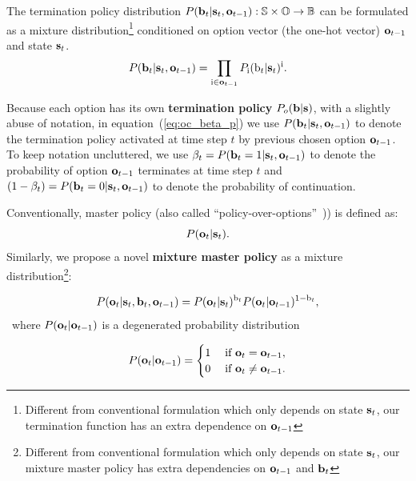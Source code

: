 The termination policy distribution
$P({\mathbf{b}}_t|{\mathbf{s}}_t,{\mathbf{o}}_{t-1}):{\mathbb{S}}\times{\mathbb{O}}\rightarrow{\mathbb{B}}$ can be
formulated as a mixture distribution\footnote{Different from
  conventional formulation which only depends on state ${\mathbf{s}}_t$,
  our termination function has an extra dependence on
  ${\mathbf{o}}_{t-1}$} conditioned on option vector (the one-hot vector)
${\mathbf{o}}_{t-1}$ and state ${\mathbf{s}}_t$.
\begin{equation}
  \label{eq:oc_beta_p}
P({\mathbf{b}}_t|{\mathbf{s}}_t,{\mathbf{o}}_{t-1}) = \prod_{{\textnormal{i}}\in{\mathbf{o}}_{t-1}}P_{{\textnormal{i}}}({\textnormal{b}}_t|{\mathbf{s}}_t)^{{\textnormal{i}}}.
\end{equation}

Because each option has its own \textbf{termination policy}
$P_o({\mathbf{b}}|{\mathbf{s}})$, with a slightly abuse of notation, in
equation~(\ref{eq:oc_beta_p}) we use
$P({\mathbf{b}}_t|{\mathbf{s}}_t,{\mathbf{o}}_{t-1})$ to denote the termination policy
activated at time step $t$ by previous chosen option
${\mathbf{o}}_{t-1}$. To keep notation uncluttered, we use
$\beta_t=P({\mathbf{b}}_t=1|{\mathbf{s}}_t,{\mathbf{o}}_{t-1})$ to denote the probability
of option ${\mathbf{o}}_{t-1}$ terminates at time step $t$ and
$(1-\beta_t) = P({\mathbf{b}}_t=0|{\mathbf{s}}_t,{\mathbf{o}}_{t-1})$ to denote the
probability of continuation.

Conventionally, master policy \cite{zhang2019dac} (also called
``policy-over-options''~\cite{sutton1999between,bacon2017option}))
is defined as:
\begin{equation}
  \label{eq:oc_master}
  P({\mathbf{o}}_t|{\mathbf{s}}_t).
\end{equation}
Similarly, we propose a novel \textbf{mixture master policy} as a
mixture distribution\footnote{Different from conventional
  formulation which only depends on state ${\mathbf{s}}_t$, our mixture
  master policy has extra dependencies on ${\mathbf{o}}_{t-1}$ and
  ${\mathbf{b}}_t$}:

\begin{equation}
  \label{eq:oc_po}
P({\mathbf{o}}_t|{\mathbf{s}}_t, {\mathbf{b}}_t,{\mathbf{o}}_{t-1}) = P({\mathbf{o}}_t|{\mathbf{s}}_t)^{{\textnormal{b}}_t}P({\mathbf{o}}_t|{\mathbf{o}}_{t-1})^{1-{\textnormal{b}}_t},
\end{equation}
~where $P({\mathbf{o}}_t|{\mathbf{o}}_{t-1})$ is a degenerated probability
distribution~\cite{puterman2014markov}

\begin{equation}
  \label{eq:deg_puterman}
P({\mathbf{o}}_t|{\mathbf{o}}_{t-1}) = 
\begin{cases}
  1&\;\text{if } {\mathbf{o}}_t={\mathbf{o}}_{t-1},\\
  0&\;\text{if } {\mathbf{o}}_t\neq{\mathbf{o}}_{t-1}.
\end{cases}
\end{equation}

